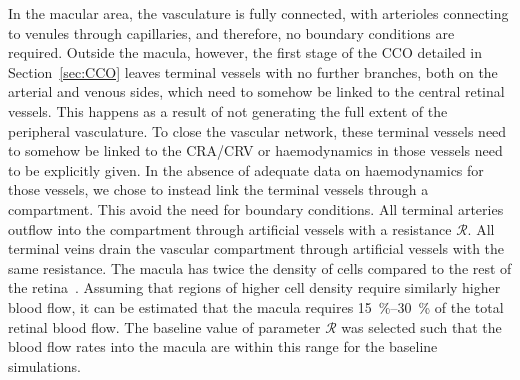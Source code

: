 \documentclass[11pt,]{article}
\begin{document}
In the macular area, the vasculature is fully connected, with
arterioles connecting to venules through capillaries, and therefore, no boundary conditions are required.
Outside the macula, however, the first stage of the CCO detailed in
Section~\ref{sec:CCO} leaves terminal vessels with no further branches, both on the arterial and venous sides, which need to somehow be linked to the central retinal vessels.
This happens as a result of not generating the full extent of the peripheral vasculature.
To close the vascular network, these terminal vessels need to somehow be linked to the CRA/CRV or haemodynamics in those vessels need to be explicitly given.
In the absence of adequate data on haemodynamics for those vessels, we chose to instead link the terminal vessels through a compartment.
This avoid the need for boundary conditions.
All terminal arteries outflow into the compartment through artificial vessels with a resistance $\mathcal R$.
All terminal veins drain the vascular compartment through artificial vessels with the same resistance. 
The macula has twice the density of cells compared to the rest of the retina~\cite{Zouache2022}.
Assuming that regions of higher cell density require similarly higher blood flow, it can be estimated that the macula requires \SIrange{15}{30}{\percent} of the total retinal blood flow.
The baseline value of parameter $\mathcal R$ was selected such that the blood flow rates into the macula are within this range for the baseline simulations.
\end{document}
